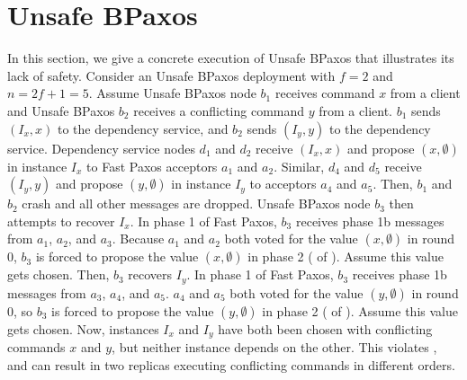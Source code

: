 \section{Unsafe BPaxos}
In this section, we give a concrete execution of Unsafe BPaxos that illustrates
its lack of safety. Consider an Unsafe BPaxos deployment with $f = 2$ and $n =
2f + 1 = 5$.
%
Assume Unsafe BPaxos node $b_1$ receives command $x$ from a client and
Unsafe BPaxos $b_2$ receives a conflicting command $y$ from a client. $b_1$
sends $(I_x, x)$ to the dependency service, and $b_2$ sends $(I_y, y)$ to the
dependency service. Dependency service nodes $d_1$ and $d_2$ receive $(I_x, x)$
and propose $(x, \emptyset)$ in instance $I_x$ to Fast Paxos acceptors $a_1$
and $a_2$. Similar, $d_4$ and $d_5$ receive $(I_y, y)$ and propose $(y,
\emptyset)$ in instance $I_y$ to acceptors $a_4$ and $a_5$. Then, $b_1$ and
$b_2$ crash and all other messages are dropped. Unsafe BPaxos node $b_3$
then attempts to recover $I_x$. In phase 1 of Fast Paxos, $b_3$ receives phase
1b messages from $a_1$, $a_2$, and $a_3$. Because $a_1$ and $a_2$ both voted
for the value $(x, \emptyset{})$ in round $0$, $b_3$ is forced to propose the
value $(x, \emptyset)$ in phase 2 ( of
). Assume this value gets chosen. Then, $b_3$ recovers
$I_y$. In phase 1 of Fast Paxos, $b_3$ receives phase 1b messages from $a_3$,
$a_4$, and $a_5$. $a_4$ and $a_5$ both voted for the value $(y, \emptyset{})$
in round $0$, so $b_3$ is forced to propose the value $(y, \emptyset)$ in phase
2 ( of ). Assume this value gets
chosen. Now, instances $I_x$ and $I_y$ have both been chosen with conflicting
commands $x$ and $y$, but neither instance depends on the other. This violates
, and can result in two replicas executing
conflicting commands in different orders.
